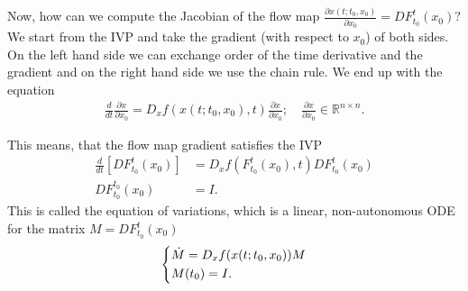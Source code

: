 Now, how can we compute the Jacobian of the flow map $\frac{\partial  {x}(t; t_0,  {x}_0)}{ \partial  {x}_0} = DF _{t_0}^{t}( {x}_0)$? We start from the IVP and take the gradient (with respect to $x_0$) of both sides. On the left hand side we can exchange order of the time derivative and the gradient and on the right hand side we use the chain rule. We end up with the equation
\begin{align}
	\frac{d}{dt}\frac{\partial  {x}}{\partial  {x}_0} = D_ {x} f( {x}(t; t_0,  {x}_0), t) \frac{\partial  {x}}{\partial  {x}_0}; \quad \frac{\partial x}{\partial x_0} \in \mathbb{R}^{n \times n}.
\end{align}

This means, that the flow map gradient satisfies the IVP
\begin{align}
	\frac{d}{dt}\left[ DF_{t_0}^{t}( {x}_0)\right] &= D_{ {x}}f(F_{t_0}^{t}( {x}_0), t) DF_{t_0}^{t}( {x}_0) \\
	DF_{t_0}^{t_0}( {x}_0) &= I.
\end{align}
This is called the equation of variations, which is a linear, non-autonomous ODE for the matrix $M = DF_{t_0}^{t}(x_0)$
\begin{align}
	\begin{dcases}
		\dot{M} = D_ {x} f( {x}(t; t_0,  {x}_0)) M \\ M(t_0) = I.
	\end{dcases}
\end{align}

